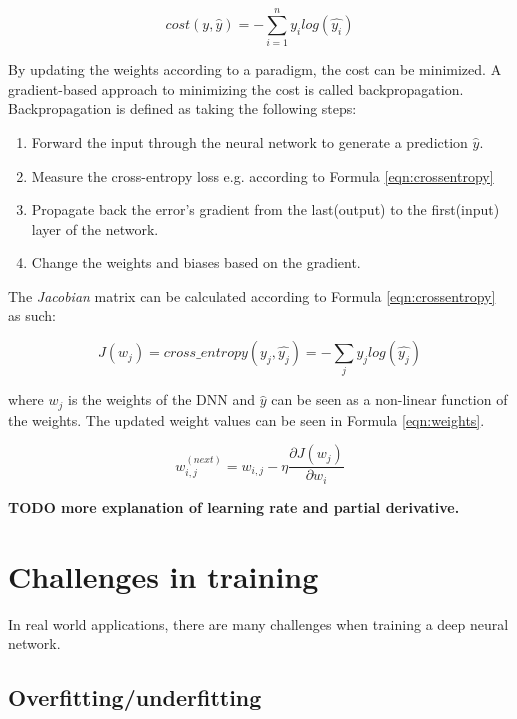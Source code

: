 \documentclass[english, bibtex]{kththesis}
\begin{document}
\begin{equation}
	cost(y, \hat{y}) = - \sum\limits_{i=1}^{n} y_i log(\hat{y_i})
  	\label{eqn:crossentropy}
\end{equation}

By updating the weights according to a paradigm, the cost can be minimized. A gradient-based approach to minimizing the cost is called backpropagation\cite{Rumelhart1986}. Backpropagation is defined as taking the following steps:

\begin{enumerate}
\item Forward the input through the neural network to generate a prediction $\hat{y}$.
\item Measure the cross-entropy loss e.g. according to Formula \ref{eqn:crossentropy} 
\item Propagate back the error’s gradient from the last(output) to the first(input) layer of the network.
\item Change the weights and biases based on the gradient.
\end{enumerate}

The \textit{Jacobian} matrix can be calculated according to Formula \ref{eqn:crossentropy} as such: 

\begin{equation}
	J(w_j) = cross\_entropy(y_j,\hat{y_j}) = - \sum_{j} y_j log(\hat{y_j})
  	\label{eqn:jacobian}
\end{equation}


where $w_j$ is the weights of the DNN and $\hat{y}$ can be seen as a non-linear function of the weights. The updated weight values can be seen in Formula \ref{eqn:weights}. 

\begin{equation}
	w_{i,j}^{(next)} = w_{i,j} - \eta \frac{\partial J(w_j)}{\partial w_i}
  	\label{eqn:weights}
\end{equation}

\textbf{TODO more explanation of learning rate and partial derivative.}

\section{Challenges in training}

In real world applications, there are many challenges when training a deep neural network.

\subsection{Overfitting/underfitting}
\end{document}
